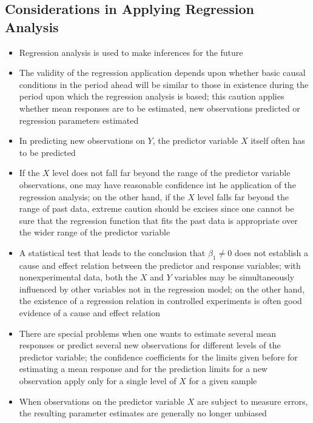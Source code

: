 \subsection{Considerations in Applying Regression Analysis}
\begin{itemize}
\item Regression analysis is used to make inferences for the future
\item The validity of the regression application depends upon whether basic causal conditions in the period ahead will be similar to those in existence during the period upon which the regression analysis is based; this caution applies whether mean responses are to be estimated, new observations predicted or regression parameters estimated 
\item In predicting new observations on $Y$, the predictor variable $X$ itself often has to be predicted 
\item If the $X$ level does not fall far beyond the range of the predictor variable observations, one may have reasonable confidence int he application of the regression analysis; on the other hand, if the $X$ level falls far beyond the range of past data, extreme caution should be excises since one cannot be sure that the regression function that fits the past data is appropriate over the wider range of the predictor variable
\item A statistical test that leads to the conclusion that $\beta_1 \neq 0$ does not establish a cause and effect relation between the predictor and response variables; with nonexperimental data, both the $X$ and $Y$ variables may be simultaneously influenced by other variables not in the regression model; on the other hand, the existence of a regression relation in controlled experiments is often good evidence of a cause and effect relation
\item There are special problems when one wants to estimate several mean responses or predict several new observations for different levels of the predictor variable; the confidence coefficients for the limits given before for estimating a mean response and for the prediction limits for a new observation apply only for a single level of $X$ for a given sample
\item When observations on the predictor variable $X$ are subject to measure errors, the resulting parameter estimates are generally no longer unbiased
\end{itemize}

